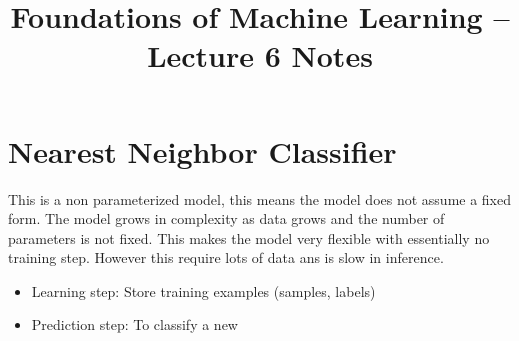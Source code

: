 \documentclass[11pt]{article}
\title{Foundations of Machine Learning -- Lecture 6 Notes}
\author{}
\date{}
\begin{document}
\maketitle
\section*{Nearest Neighbor Classifier}
This is a non parameterized model, this means the model does not assume a fixed form.
The model grows in complexity as data grows and the number of parameters is not fixed.
This makes the model very flexible with essentially no training step. However this require lots of data ans is slow in inference.

\begin{itemize}
	\item Learning step: Store training examples (samples, labels)
	\item Prediction step: To classify a new

\end{itemize}
\end{document}
